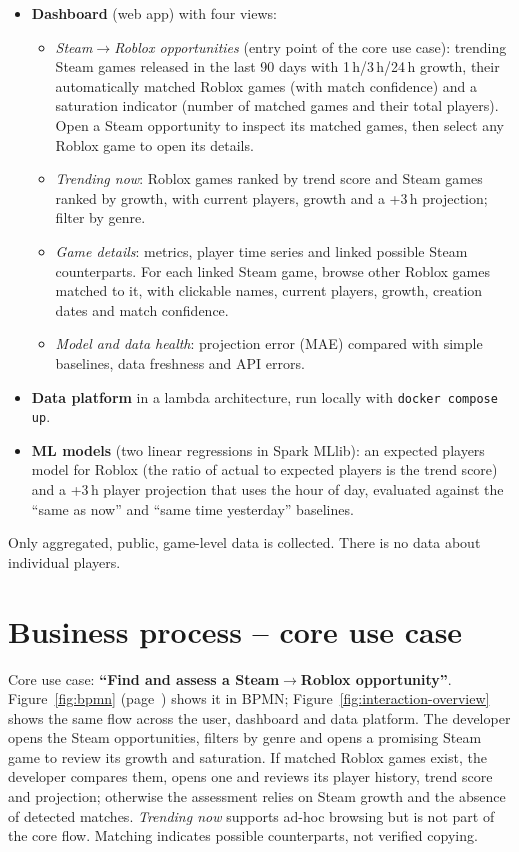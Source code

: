 \documentclass[10pt,a4paper]{article}
\begin{document}
\begin{itemize}
  \item \textbf{Dashboard} (web app) with four views:
  \begin{itemize}
    \item \emph{Steam$\rightarrow$Roblox opportunities} (entry point of the core use case): trending Steam games released in the last 90 days with 1\,h/3\,h/24\,h growth, their automatically matched Roblox games (with match confidence) and a saturation indicator (number of matched games and their total players). Open a Steam opportunity to inspect its matched games, then select any Roblox game to open its details.
    \item \emph{Trending now}: Roblox games ranked by trend score and Steam games ranked by growth, with current players, growth and a +3\,h projection; filter by genre.
    \item \emph{Game details}: metrics, player time series and linked possible Steam counterparts. For each linked Steam game, browse other Roblox games matched to it, with clickable names, current players, growth, creation dates and match confidence.
    \item \emph{Model and data health}: projection error (MAE) compared with simple baselines, data freshness and API errors.
  \end{itemize}
  \item \textbf{Data platform} in a lambda architecture, run locally with \texttt{docker compose up}.
  \item \textbf{ML models} (two linear regressions in Spark MLlib): an expected players model for Roblox (the ratio of actual to expected players is the trend score) and a +3\,h player projection that uses the hour of day, evaluated against the ``same as now'' and ``same time yesterday'' baselines.
\end{itemize}
Only aggregated, public, game-level data is collected. There is no data about individual players.

\section{Business process -- core use case}
Core use case: \textbf{``Find and assess a Steam$\rightarrow$Roblox opportunity''}. Figure~\ref{fig:bpmn} (page~\pageref{fig:bpmn}) shows it in BPMN; Figure~\ref{fig:interaction-overview} shows the same flow across the user, dashboard and data platform. The developer opens the Steam opportunities, filters by genre and opens a promising Steam game to review its growth and saturation. If matched Roblox games exist, the developer compares them, opens one and reviews its player history, trend score and projection; otherwise the assessment relies on Steam growth and the absence of detected matches. \emph{Trending now} supports ad-hoc browsing but is not part of the core flow. Matching indicates possible counterparts, not verified copying.
\end{document}
